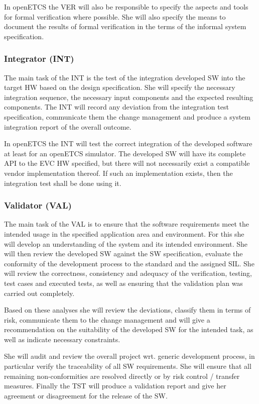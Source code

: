 In openETCS the VER will also be responsible to specify the aspects and tools
for formal verification where possible. She will also specify the means to
document the results of formal verification in the terms of the informal system
specification.

\subsubsection{Integrator (INT)}
\label{sec:integrator}

The main task of the INT is the test of the integration developed SW into the
target HW based on the design specification. She will specify the necessary
integration sequence, the necessary input components and the expected resulting
components. The INT will record any deviation from the integration test
specification, communicate them the change management and produce a system
integration report of the overall outcome.

In openETCS the INT will test the correct integration of the developed software
at least for an openETCS simulator. The developed SW will have its
complete API to the EVC HW specified, but there will not necessarily exist a
compatible vendor implementation thereof. If such an implementation exists, then
the integration test shall be done using it.

\subsubsection{Validator (VAL)}
\label{sec:validator}

The main task of the VAL is to ensure that the software requirements meet the
intended usage in the specified application area and environment. For this she
will develop an understanding of the system and its intended environment. She
will then review the developed SW against the SW specification, evaluate the
conformity of the development process to the standard and the assigned SIL. She
will review the correctness, consistency and adequacy of the verification,
testing, test cases and executed tests, as well as ensuring that the validation
plan was carried out completely.

Based on these analyses she will review the deviations, classify them in terms
of risk, communicate them to the change management and will give a
recommendation on the suitability of the developed SW for the intended task, as
well as indicate necessary constraints.

She will audit and review the overall project wrt. generic development process,
in particular verify the traceability of all SW requirements. She will ensure
that all remaining non-conformities are resolved directly or by risk control /
transfer measures. Finally the TST will produce a validation report and give her
agreement or disagreement for the release of the SW.

